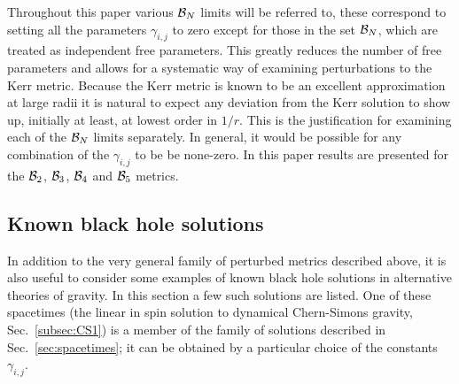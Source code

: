 Throughout this paper various ${\cal{B}}_{N}$ limits will be referred to, these correspond to setting all the parameters $\gamma_{i,j}$ to zero except for those in the set ${\cal{B}}_{N}$, which are treated as independent free parameters. This greatly reduces the number of free parameters and allows for a systematic way of examining perturbations to the Kerr metric. Because the Kerr metric is known to be an excellent approximation at large radii it is natural to expect any deviation from the Kerr solution to show up, initially at least, at lowest order in $1/r$. This is the justification for examining each of the ${\cal{B}}_{N}$ limits separately. In general, it would be possible for any combination of the $\gamma_{i,j}$ to be be none-zero. In this paper results are presented for the ${\cal{B}}_{2}$, ${\cal{B}}_{3}$, ${\cal{B}}_{4}$ and ${\cal{B}}_{5}$ metrics.

\subsection{Known black hole solutions}
In addition to the very general family of perturbed metrics described above, it is also useful to consider some examples of known black hole solutions in alternative theories of gravity. In this section a few such solutions are listed. One of these spacetimes (the linear in spin solution to dynamical Chern-Simons gravity, Sec.\ \ref{subsec:CS1}) is a member of the family of solutions described in Sec.~\ref{sec:spacetimes}; it can be obtained by a particular choice of the constants $\gamma_{i,j}$. 

